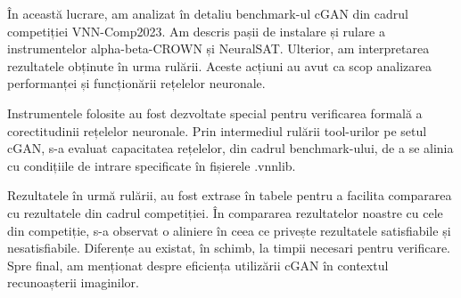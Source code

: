 \hspace{0.5 cm}
În această lucrare, am analizat în detaliu benchmark-ul cGAN din cadrul competiției VNN-Comp2023. Am descris pașii de instalare și rulare a instrumentelor alpha-beta-CROWN și NeuralSAT. Ulterior, am interpretarea rezultatele obținute în urma rulării. Aceste acțiuni au avut ca scop analizarea performanței și funcționării rețelelor neuronale.

Instrumentele folosite au fost dezvoltate special pentru verificarea formală a corectitudinii rețelelor neuronale. Prin intermediul rulării tool-urilor pe setul cGAN, s-a evaluat capacitatea rețelelor, din cadrul benchmark-ului, de a se alinia cu condițiile de intrare specificate în fișierele .vnnlib.

Rezultatele în urmă rulării, au fost extrase în tabele pentru a facilita compararea cu rezultatele din cadrul competiției. În compararea rezultatelor noastre cu cele din competiție, s-a observat o aliniere în ceea ce privește rezultatele satisfiabile și nesatisfiabile. Diferențe au existat, în schimb, la timpii necesari pentru verificare. Spre final, am menționat despre eficiența utilizării cGAN în contextul recunoașterii imaginilor.